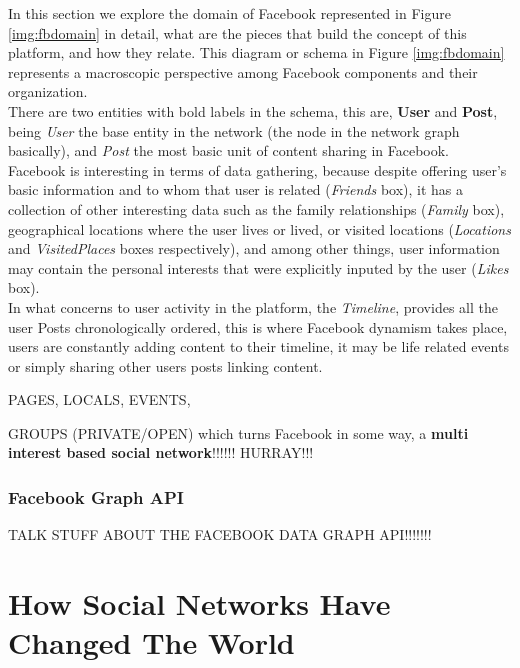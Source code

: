 \indent In this section we explore the domain of Facebook represented in Figure \ref{img:fbdomain} in detail, what are the pieces that build
the concept of this platform, and how they relate. This diagram or schema in Figure \ref{img:fbdomain} represents
a macroscopic perspective among Facebook components and their organization.\\
\indent There are two entities with bold labels in the schema, this are, \textbf{User} and \textbf{Post}, being
\textit{User} the base entity in the network (the node in the network graph basically), and \textit{Post} the
most basic unit of content sharing in Facebook.\\
\indent Facebook is interesting in terms of data gathering, because despite offering user's basic information
and to whom that user is related (\textit{Friends} box), it has a collection of other interesting data
such as the family relationships (\textit{Family} box), geographical locations where the user lives or lived, or
visited locations (\textit{Locations} and \textit{VisitedPlaces} boxes respectively), and among other things, user information
may contain the personal interests that were explicitly inputed by the user (\textit{Likes} box).\\
\indent In what concerns to user activity in the platform, the \textit{Timeline}, provides all the user
Posts chronologically ordered, this is where Facebook dynamism takes place, users are constantly
adding content to their timeline, it may be life related events or simply sharing other users posts
linking content.

PAGES, LOCALS, EVENTS,

GROUPS (PRIVATE/OPEN) which turns Facebook in some way, a \textbf{multi interest based social network}!!!!!! HURRAY!!!

\subsubsection*{Facebook Graph API}
TALK STUFF ABOUT THE FACEBOOK DATA GRAPH API!!!!!!!


\section{How Social Networks Have Changed The World}
